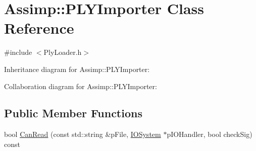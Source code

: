 \hypertarget{class_assimp_1_1_p_l_y_importer}{\section{Assimp\+:\+:P\+L\+Y\+Importer Class Reference}
\label{class_assimp_1_1_p_l_y_importer}
}


{\ttfamily \#include $<$Ply\+Loader.\+h$>$}



Inheritance diagram for Assimp\+:\+:P\+L\+Y\+Importer\+:


Collaboration diagram for Assimp\+:\+:P\+L\+Y\+Importer\+:
\subsection*{Public Member Functions}
\begin{DoxyCompactItemize}
\item 
bool \hyperlink{class_assimp_1_1_p_l_y_importer_a7553dbdfb2e470a2a22eafab95329385}{Can\+Read} (const std\+::string \&p\+File, \hyperlink{class_assimp_1_1_i_o_system}{I\+O\+System} $\ast$p\+I\+O\+Handler, bool check\+Sig) const 
\end{DoxyCompactItemize}
